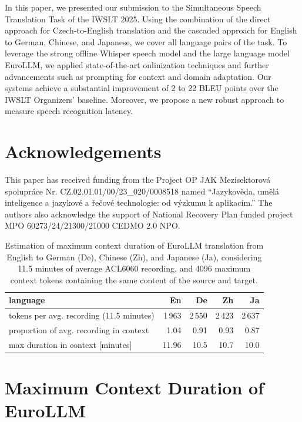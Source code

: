 \documentclass[11pt]{article}
\begin{document}
In this paper, we presented our submission to the Simultaneous Speech Translation Task of the IWSLT 2025. Using the combination of the direct approach for Czech-to-English translation and the cascaded approach for  English to German, Chinese, and Japanese, we cover all language pairs of the task. To leverage the strong offline Whisper speech model and the large language model EuroLLM, we applied state-of-the-art onlinization techniques and further advancements such as prompting for context and domain adaptation. Our systems achieve a substantial improvement of 2 to 22 BLEU points over the IWSLT Organizers' baseline. Moreover, we propose a new robust approach to measure speech recognition latency.


\section*{Acknowledgements}
This paper has received funding from the
Project OP JAK Mezisektorová spolupráce
Nr. CZ.02.01.01/00/23\_020/0008518 named
``Jazykověda, umělá inteligence a jazykové a
řečové technologie: od výzkumu k aplikacím.''
The authors also acknowledge the support of
National Recovery Plan funded project MPO
60273/24/21300/21000 CEDMO 2.0 NPO.



\appendix

\begin{table}[ht]
    \centering
    \begin{tabular}{l|r|rrr}
 language  &  En & De & Zh & Ja \\
 \hline
 tokens per avg. recording (11.5 minutes) & 1\,963 & 2\,550 & 2\,423 & 2\,637  \\
 proportion of avg. recording in context & 1.04 & 0.91 & 0.93 & 0.87 \\
 max duration in context [minutes] & 11.96 & 10.5 & 10.7 & 10.0 \\
    \end{tabular}
    \caption{Estimation of maximum context duration of EuroLLM translation from English to German (De), Chinese (Zh), and Japanese (Ja), considering 11.5 minutes of average ACL6060 recording, and 4096 maximum context tokens containing the same content of the source and target.}
    \label{tab:dev-tokens}
\end{table}

\section{Maximum Context Duration of EuroLLM}
\label{sec:maxcontext}
\end{document}
